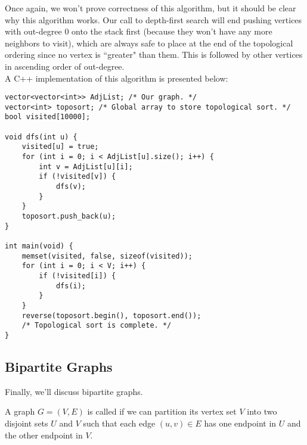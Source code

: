 Once again, we won't prove correctness of this algorithm, but it should be clear why this algorithm works. Our call to depth-first search will end pushing vertices with out-degree $0$ onto the stack first (because they won't have any more neighbors to visit), which are always safe to place at the end of the topological ordering since no vertex is ``greater" than them. This is followed by other vertices in ascending order of out-degree. \\


A C++ implementation of this algorithm is presented below:




\begin{lstlisting}
vector<vector<int>> AdjList; /* Our graph. */
vector<int> toposort; /* Global array to store topological sort. */
bool visited[10000];

void dfs(int u) {
    visited[u] = true;
    for (int i = 0; i < AdjList[u].size(); i++) {
        int v = AdjList[u][i];
        if (!visited[v]) {
            dfs(v);
        }
    }
    toposort.push_back(u);
}

int main(void) {
    memset(visited, false, sizeof(visited));
    for (int i = 0; i < V; i++) {
        if (!visited[i]) {
            dfs(i);
        }
    }
    reverse(toposort.begin(), toposort.end());
    /* Topological sort is complete. */
}
\end{lstlisting}




\subsection{Bipartite Graphs}

Finally, we'll discuss bipartite graphs.

\begin{definition}
A graph $G = (V, E)$ is called  if we can partition its vertex set $V$ into two disjoint sets $U$ and $V$ such that each edge $(u, v) \in E$ has one endpoint in $U$ and the other endpoint in $V$.  
\end{definition}

